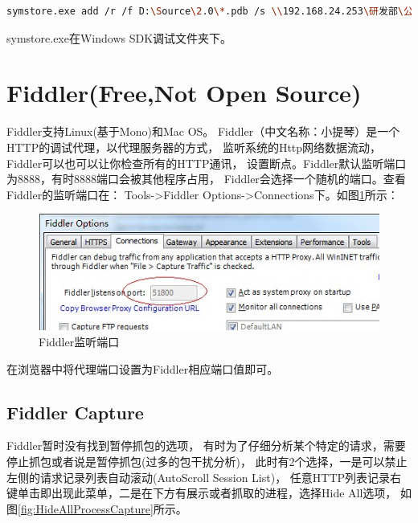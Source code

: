 \documentclass{book}
\begin{document}
\begin{lstlisting}[language=Bash]
symstore.exe add /r /f D:\Source\2.0\*.pdb /s \\192.168.24.253\研发部\公用\Develop\Debug\Symbol /t BRProduct /z pri
\end{lstlisting}

symstore.exe在Windows SDK调试文件夹下。

\section{Fiddler(Free,Not Open Source)}

Fiddler支持Linux(基于Mono)和Mac OS。
Fiddler（中文名称：小提琴）是一个HTTP的调试代理，以代理服务器的方式，
监听系统的Http网络数据流动，Fiddler可以也可以让你检查所有的HTTP通讯，
设置断点。Fiddler默认监听端口为8888，有时8888端口会被其他程序占用，
Fiddler会选择一个随机的端口。查看Fiddler的监听端口在：
Tools->Fiddler Options->Connections下。如图\ref{fig:FiddlerListeningPort}所示：

\begin{figure}[htbp]
	\centering
	\includegraphics[scale=0.8]{FiddlerListeningPort.jpg}
	\caption{Fiddler监听端口}
	\label{fig:FiddlerListeningPort}
\end{figure}

在浏览器中将代理端口设置为Fiddler相应端口值即可。

\subsection{Fiddler Capture}

Fiddler暂时没有找到暂停抓包的选项，
有时为了仔细分析某个特定的请求，需要停止抓包或者说是暂停抓包(过多的包干扰分析)，
此时有2个选择，一是可以禁止左侧的请求记录列表自动滚动(AutoScroll Session List)，
任意HTTP列表记录右键单击即出现此菜单，二是在下方有展示或者抓取的进程，选择Hide All选项，
如图\ref{fig:HideAllProcessCapture}所示。
\end{document}
